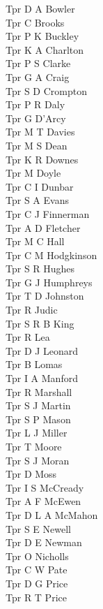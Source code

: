 \begin{multicols}{3}
  Tpr D A Bowler \\
  Tpr C Brooks \\
  Tpr P K Buckley \\
  Tpr K A Charlton \\
  Tpr P S Clarke \\
  Tpr G A Craig \\
  Tpr S D Crompton \\
  Tpr P R Daly \\
  Tpr G D'Arcy \\
  Tpr M T Davies \\
  Tpr M S Dean \\
  Tpr K R Downes \\
  Tpr M Doyle \\
  Tpr C I Dunbar \\
  Tpr S A Evans \\
  Tpr C J Finnerman \\
  Tpr A D Fletcher \\
  Tpr M C Hall \\
  Tpr C M Hodgkinson \\
  Tpr S R Hughes \\
  Tpr G J Humphreys \\
  Tpr T D Johnston \\
  Tpr R Judic \\
  Tpr S R B King \\
  Tpr R Lea \\
  Tpr D J Leonard \\
  Tpr B Lomas \\
  Tpr I A Manford \\
  Tpr R Marshall \\
  Tpr S J Martin \\
  Tpr S P Mason \\
  Tpr L J Miller \\
  Tpr T Moore \\
  Tpr S J Moran \\
  Tpr D Moss \\
  Tpr I S McCready \\
  Tpr A F McEwen \\
  Tpr D L A McMahon \\
  Tpr S E Newell \\
  Tpr D E Newman \\
  Tpr O Nicholls \\
  Tpr C W Pate \\
  Tpr D G Price \\
  Tpr R T Price \\

\end{multicols}
